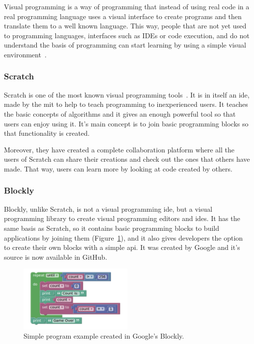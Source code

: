 Visual programming is a way of programming that instead of using real code in a real programming
language uses a visual interface to create programs and then translate them to a well known
language. This way, people that are not yet used to programming languages, interfaces such as IDEs
or code execution, and do not understand the basis of programming can start learning by using a
simple visual environment~\cite{visual_programming}.

\subsubsection{Scratch}

Scratch is one of the most known visual programming tools~\cite{scratch}. It is in itself an
\acrshort{ide}, made by the \acrshort{mit} to help to teach programming to inexperienced users. It
teaches the basic concepts of algorithms and it gives an enough powerful tool so that users can
enjoy using it. It's main concept is to join basic programming blocks so that functionality is
created.

Moreover, they have created a complete collaboration platform where all the users of Scratch can
share their creations and check out the ones that others have made. That way, users can learn more
by looking at code created by others.

\subsubsection{Blockly}

Blockly, unlike Scratch, is not a visual programming \acrshort{ide}, but a visual programming
library to create visual programming editors and \acrshort{ide}s. It has the same basis as Scratch,
so it contains basic programming blocks to build applications by joining them
(Figure~\ref{fig:blockly}), and it also gives developers the option to create their own blocks with
a simple \acrshort{api}. It was created by Google and it's source is now available in GitHub.

\begin{figure}[!htbp]
	\centering
	\includegraphics[width=0.5\textwidth]{fig/blockly}
	\caption{Simple program example created in Google's Blockly.}\label{fig:blockly}
\end{figure}

